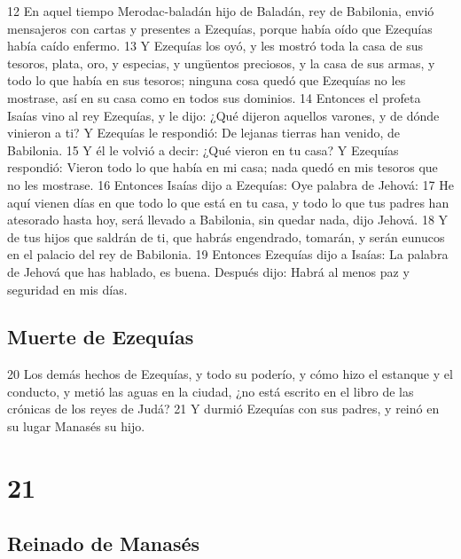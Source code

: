  
12 En aquel tiempo Merodac-baladán hijo de Baladán, rey de Babilonia, envió mensajeros con cartas y presentes a Ezequías, porque había oído que Ezequías había caído enfermo.
13 Y Ezequías los oyó, y les mostró toda la casa de sus tesoros, plata, oro, y especias, y ungüentos preciosos, y la casa de sus armas, y todo lo que había en sus tesoros; ninguna cosa quedó que Ezequías no les mostrase, así en su casa como en todos sus dominios.
14 Entonces el profeta Isaías vino al rey Ezequías, y le dijo: ¿Qué dijeron aquellos varones, y de dónde vinieron a ti? Y Ezequías le respondió: De lejanas tierras han venido, de Babilonia.
15 Y él le volvió a decir: ¿Qué vieron en tu casa? Y Ezequías respondió: Vieron todo lo que había en mi casa; nada quedó en mis tesoros que no les mostrase.
16 Entonces Isaías dijo a Ezequías: Oye palabra de Jehová:
17 He aquí vienen días en que todo lo que está en tu casa, y todo lo que tus padres han atesorado hasta hoy, será llevado a Babilonia, sin quedar nada, dijo Jehová. 
18 Y de tus hijos que saldrán de ti, que habrás engendrado, tomarán, y serán eunucos en el palacio del rey de Babilonia. 
19 Entonces Ezequías dijo a Isaías: La palabra de Jehová que has hablado, es buena. Después dijo: Habrá al menos paz y seguridad en mis días.
\section*{Muerte de Ezequías}

 
20 Los demás hechos de Ezequías, y todo su poderío, y cómo hizo el estanque y el conducto, y metió las aguas en la ciudad, ¿no está escrito en el libro de las crónicas de los reyes de Judá?
21 Y durmió Ezequías con sus padres, y reinó en su lugar Manasés su hijo.

\chapter{21}

\section*{Reinado de Manasés}

 

